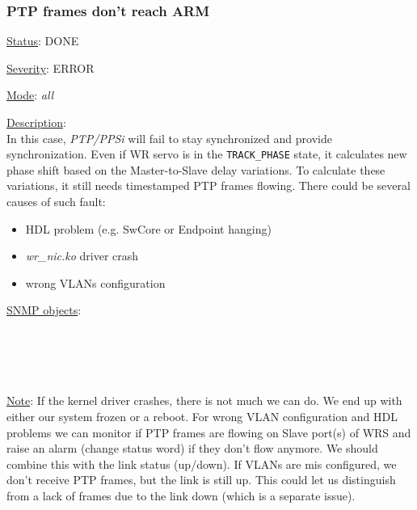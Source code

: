 \subsubsection{\bf PTP frames don't reach ARM}
		\label{fail:timing:no_frames}
		\begin{packed_enum}
			\item [] \underline{Status}: DONE
			\item [] \underline{Severity}: ERROR
			\item [] \underline{Mode}: \emph{all}
			\item [] \underline{Description}:\\
				In this case, \emph{PTP/PPSi} will fail to stay synchronized and provide
				synchronization. Even if WR servo is in the \texttt{TRACK\_PHASE} state,
				it calculates new phase shift based on the Master-to-Slave delay
				variations. To calculate these variations, it still needs timestamped
				PTP frames flowing. There could be several causes of such fault:
				\begin{itemize}
					\item HDL problem (e.g. SwCore or Endpoint hanging)
					\item \emph{wr\_nic.ko} driver crash
					\item wrong VLANs configuration
				\end{itemize}
			\item [] \underline{SNMP objects}:\\
				\\
				\\
				\\
				\\
			\item [] \underline{Note}: If the kernel driver crashes, there is not much
				we can do. We end up with either our system frozen or a reboot. For
				wrong VLAN configuration and HDL problems we can monitor if PTP frames
				are flowing on Slave port(s) of WRS and raise an alarm (change status
				word) if they don't flow anymore. We should combine this with the link
				status (up/down). If VLANs are mis configured, we don't receive PTP
				frames, but the link is still up. This could let us distinguish from a
				lack of frames due to the link down (which is a separate issue).
		\end{packed_enum}

